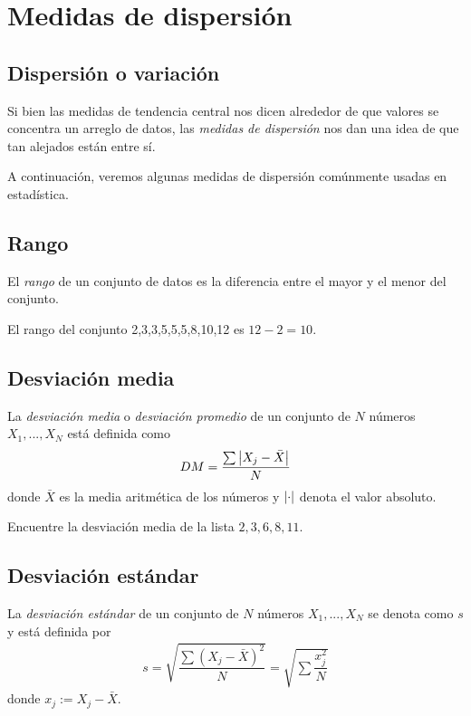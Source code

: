 \section{Medidas de dispersión}

\subsection{Dispersión o variación}
Si bien las medidas de tendencia central nos dicen alrededor de que valores se concentra un arreglo de datos, las \emph{medidas de dispersión} nos dan una idea de que tan alejados están entre sí.





A continuación, veremos algunas medidas de dispersión comúnmente usadas en estadística.

\subsection{Rango}
El \emph{rango}
de un conjunto de datos es la diferencia entre el mayor y el menor del conjunto.



\begin{ejemplo}
	El rango del conjunto 2,3,3,5,5,5,8,10,12 es $12-2=10.$
\end{ejemplo}


\subsection{Desviación media}
La \emph{desviación media} o \emph{desviación promedio} de un conjunto de $N$ números $X_{1},...,X_{N}$ está definida como
\begin{align}
	DM=\dfrac{\sum \left|X_{j}-\bar{X}\right|}{N}
\end{align}
donde $\bar{X}$ es la media aritmética de los números y $\left|\cdot\right|$ denota el valor absoluto.


\begin{ejemplo}
	Encuentre la desviación media de la lista $2,3,6,8,11.$
\end{ejemplo}


\subsection{Desviación estándar}
La \emph{desviación estándar} de un conjunto de $N$ números $X_{1},...,X_{N}$ se denota como $s$ y está definida por
\begin{align}
	s=\sqrt{\dfrac{\sum\left( X_{j}-\bar{X} \right)^{2}}{N}}=\sqrt{\sum\dfrac{x_{j}^{2}}{N}}
\end{align} donde $x_{j}:=X_{j}-\bar{X}.$


